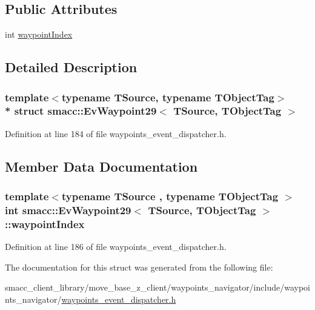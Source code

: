 \subsection*{Public Attributes}
\begin{DoxyCompactItemize}
\item 
int \hyperlink{structsmacc_1_1EvWaypoint29_a99f5d789270b7dc55fb9510bc1a226c1}{waypoint\+Index}
\end{DoxyCompactItemize}


\subsection{Detailed Description}
\subsubsection*{template$<$typename T\+Source, typename T\+Object\+Tag$>$\\*
struct smacc\+::\+Ev\+Waypoint29$<$ T\+Source, T\+Object\+Tag $>$}



Definition at line 184 of file waypoints\+\_\+event\+\_\+dispatcher.\+h.



\subsection{Member Data Documentation}
\subsubsection[{\texorpdfstring{waypoint\+Index}{waypointIndex}}]{\setlength{\rightskip}{0pt plus 5cm}template$<$typename T\+Source , typename T\+Object\+Tag $>$ int {\bf smacc\+::\+Ev\+Waypoint29}$<$ T\+Source, T\+Object\+Tag $>$\+::waypoint\+Index}\hypertarget{structsmacc_1_1EvWaypoint29_a99f5d789270b7dc55fb9510bc1a226c1}{}\label{structsmacc_1_1EvWaypoint29_a99f5d789270b7dc55fb9510bc1a226c1}


Definition at line 186 of file waypoints\+\_\+event\+\_\+dispatcher.\+h.



The documentation for this struct was generated from the following file\+:\begin{DoxyCompactItemize}
\item 
smacc\+\_\+client\+\_\+library/move\+\_\+base\+\_\+z\+\_\+client/waypoints\+\_\+navigator/include/waypoints\+\_\+navigator/\hyperlink{waypoints__event__dispatcher_8h}{waypoints\+\_\+event\+\_\+dispatcher.\+h}\end{DoxyCompactItemize}
